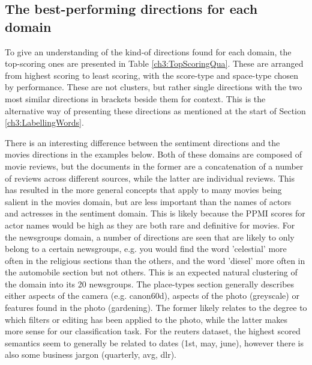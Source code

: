 \subsection{The best-performing directions for each domain}

To give an understanding of the kind-of directions found for each domain, the top-scoring ones are presented in Table \ref{ch3:TopScoringQua}. These are arranged from highest scoring to least scoring, with the score-type and space-type chosen by performance. These are not clusters, but rather single directions with the two most similar directions in brackets beside them for context. This is the alternative way of presenting these directions as mentioned at the start of Section \ref{ch3:LabellingWords}. 

There is an  interesting difference between the sentiment directions and the movies directions in the examples below. Both of these domains are composed of movie reviews, but the documents in the former are a concatenation of a number of reviews across different sources, while the latter are individual reviews. This has resulted in the more general concepts that apply to many movies being salient in the movies domain, but are less important than the names of actors and actresses in the sentiment domain. This is likely because the PPMI scores for actor names would be high as they are both rare and definitive for movies. For the newsgroups domain, a number of directions  are seen that are likely to only belong to a certain newsgroups, e.g. you would find the word 'celestial' more often in the religious sections than the others, and the word 'diesel' more often in the automobile section but not others. This is an expected natural clustering of the domain into its 20 newsgroups. The place-types section generally describes either aspects of the camera (e.g. canon60d), aspects of the photo (greyscale) or features found in the photo (gardening). The former likely relates to the degree to which filters or editing has been applied to the photo, while the latter makes more sense for our classification task. For the reuters dataset, the highest scored semantics seem to generally be related to dates (1st, may, june), however there is also some business jargon (quarterly, avg, dlr). 

